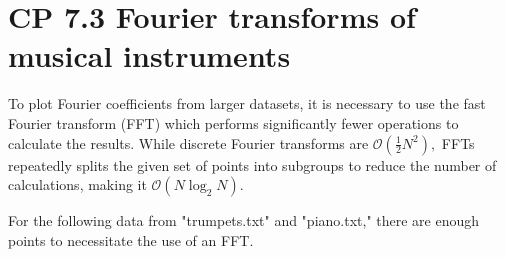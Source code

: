 \documentclass[11pt]{article}
\begin{document}
    \section{CP 7.3 Fourier transforms of musical
instruments}\label{cp-7.3-fourier-transforms-of-musical-instruments}

To plot Fourier coefficients from larger datasets, it is necessary to
use the fast Fourier transform (FFT) which performs significantly fewer
operations to calculate the results. While discrete Fourier transforms
are \(\mathcal{O}(\tfrac12 N^2),\) FFTs repeatedly splits the given set
of points into subgroups to reduce the number of calculations, making it
\(\mathcal{O}(N \log_2 N).\)

For the following data from "trumpets.txt" and "piano.txt," there are
enough points to necessitate the use of an FFT.
\end{document}
